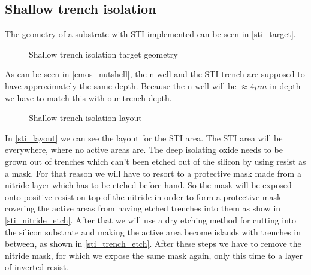 \subsection{Shallow trench isolation}\label{sti}
The geometry of a substrate with STI implemented can be seen in \autoref{sti_target}.

\begin{figure}[H]
	\centering
	\begin{tikzpicture}[node distance = 3cm, auto, thick,scale=\CrossAndTopSectionBig, every node/.style={transform shape}]
		
	\end{tikzpicture}
	\begin{tikzpicture}[node distance = 3cm, auto, thick,scale=\CrossAndTopSectionBig, every node/.style={transform shape}]
		
	\end{tikzpicture}
	\caption{Shallow trench isolation target geometry}
	\label{sti_target}
\end{figure}

As can be seen in \autoref{cmos_nutshell}, the n-well and the STI trench are supposed to have approximately the same depth.
Because the n-well will be $\approx 4 \mu m$ in depth we have to match this with our trench depth.

\begin{figure}[H]
	\centering
	\begin{tikzpicture}[node distance =1cm, auto, thick,scale=\VLSILayout, every node/.style={transform shape}]
		
	\end{tikzpicture}
	\caption{Shallow trench isolation layout}
	\label{sti_layout}
\end{figure}

In \autoref{sti_layout} we can see the layout for the STI area.
The STI area will be everywhere, where no active areas are.
The deep isolating oxide needs to be grown out of trenches which can't been etched out of the silicon by using resist as a mask.
For that reason we will have to resort to a protective mask made from a nitride layer which has to be etched before hand.
So the mask will be exposed onto positive resist on top of the nitride in order to form a protective mask covering the active areas from having etched trenches into them as show in \autoref{sti_nitride_etch}.
After that we will use a dry etching method for cutting into the silicon substrate and making the active area become islands with trenches in between, as shown in \autoref{sti_trench_etch}.
After these steps we have to remove the nitride mask, for which we expose the same mask again, only this time to a layer of inverted resist.

